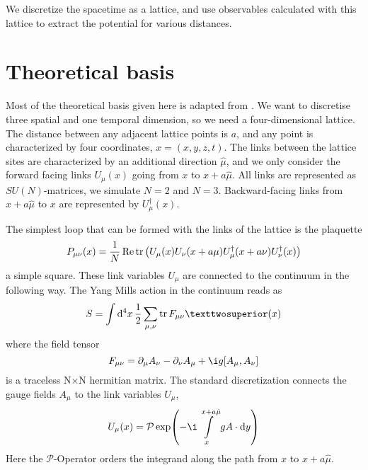 \documentclass[%
 reprint,
 amsmath,amssymb,
 aps,
]{revtex4-1}
\renewcommand{\Re}{\operatorname{Re}}
\begin{document}
We discretize the spacetime as a lattice, and use observables calculated with this lattice to extract the potential for various distances.

%


\section{Theoretical basis}

Most of the theoretical basis given here is adapted from \citet{lepagelqcd}. We want to discretise three spatial and one temporal dimension, so we need a four-dimensional lattice. The distance between any adjacent lattice points is $a$, and any point is characterized by four coordinates, $x=(x,y,z,t)$. The links between the lattice sites are characterized by an additional direction $\hat{\mu}$, and we only consider the forward facing links $U_\mu(x)$ going from $x$ to $x+a\hat{\mu}$. All links are represented as $SU(N)$-matrices, we simulate $N=2$ and $N=3$. Backward-facing links from $x+a\hat{\mu}$ to $x$ are represented by $U_\mu^\dagger(x)$.

The simplest loop that can be formed with the links of the lattice is the plaquette \[P_{\mu\nu}(x)=\frac{1}{N}\Re\tr\left(U_\mu(x)U_\nu(x+a\mu)U_\mu^\dagger(x+a\nu)U^\dagger_\nu(x)\right)\] a simple square. These link variables $U_\mu$ are connected to the continuum in the following way. The Yang Mills action in the continuum reads as \[S=\int\dd{^4x}\dfrac{1}{2}\sum\limits_{\mu,\nu}\tr F_{\mu\nu}²(x)\] where the field tensor\[F_{\mu\nu}=\partial_\mu A_\nu-\partial_\nu A_\mu+\i g [A_\mu,A_\nu]\] is a traceless N$\times$N hermitian matrix. The standard discretization connects the gauge fields $A_\mu$ to the link variables $U_\mu$, \[U_\mu(x)=\mathcal{P}\exp(-\i\int\limits_{x}^{x+a\hat{\mu}}g A\cdot\dd{y})\]
Here the $\mathcal{P}$-Operator orders the integrand along the path from $x$ to $x+a\hat{\mu}$.
\end{document}

